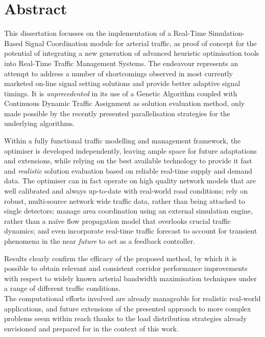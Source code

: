 \chapter*{Abstract}
This dissertation focusses on the implementation of a Real-Time Simulation-Based Signal Coordination module for arterial traffic, as proof of concept for the potential of integrating a new generation of advanced heuristic optimisation tools into Real-Time Traffic Management Systems.
The endeavour represents an attempt to address a number of shortcomings observed in most currently marketed on-line signal setting solutions and provide better adaptive signal timings.
It is \emph{unprecedented} in its use of a Genetic Algorithm coupled with Continuous Dynamic Traffic Assignment as solution evaluation method, only made possible by the recently presented parallelisation strategies for the underlying algorithms.

Within a fully functional traffic modelling and management framework, the optimiser is developed independently, leaving ample space for future adaptations and extensions, while relying on the best available technology to provide it fast and \emph{realistic} solution evaluation based on reliable real-time supply and demand data.
The optimiser can in fact operate on high quality network models that are well calibrated and always up-to-date with real-world road conditions; rely on robust, multi-source network wide traffic data, rather than being attached to single detectors; manage area coordination using an external simulation engine, rather than a na\"ive flow propagation model that overlooks crucial traffic dynamics; and even incorporate real-time traffic forecast to account for transient phenomena in the near \emph{future} to act as a feedback controller.

Results clearly confirm the efficacy of the proposed method, by which it is possible to obtain relevant and consistent corridor performance improvements with respect to widely known arterial bandwidth maximisation techniques under a range of different traffic conditions. \\
The computational efforts involved are already manageable for realistic real-world applications, and future extensions of the presented approach to more complex problems seem within reach thanks to the load distribution strategies already envisioned and prepared for in the context of this work.